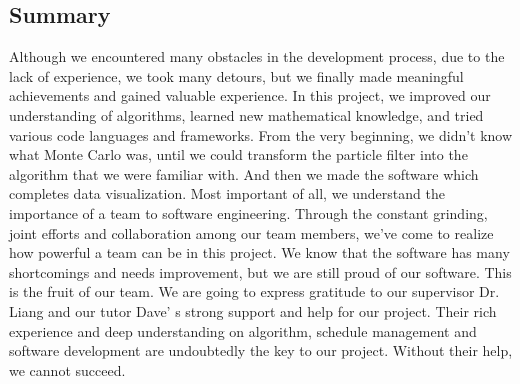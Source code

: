 \documentclass[11pt,oneside,a4paper]{article}
\begin{document}
\subsection{Summary}
Although we encountered many obstacles in the development process, due to the lack of experience, we took many detours, but we finally made meaningful achievements and gained valuable experience. In this project, we improved our understanding of algorithms, learned new mathematical knowledge, and tried various code languages and frameworks. From the very beginning, we didn't know what Monte Carlo was, until we could transform the particle filter into the algorithm that we were familiar with. And then we made the software which completes data visualization. Most important of all, we understand the importance of a team to software engineering. Through the constant grinding, joint efforts and collaboration among our team members, we've come to realize how powerful a team can be in this project. We know that the software has many shortcomings and needs improvement, but we are still proud of our software. This is the fruit of our team.
We are going to express gratitude to our supervisor Dr. Liang and our tutor Dave’ s strong support and help for our project. Their rich experience and deep understanding on algorithm, schedule management and software development are undoubtedly the key to our project. Without their help, we cannot succeed.
\end{document}
